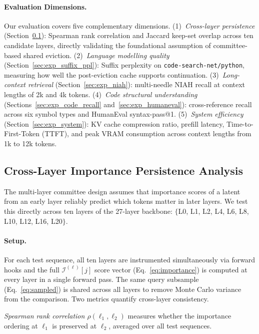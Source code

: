 \documentclass[letterpaper]{article} %
\begin{document}
\paragraph{Evaluation Dimensions.}
Our evaluation covers five complementary dimensions.
(1)~\emph{Cross-layer persistence} (Section~\ref{sec:exp_persistence}):
Spearman rank correlation and Jaccard keep-set overlap across ten
candidate layers, directly validating the foundational assumption of
committee-based shared eviction.
(2)~\emph{Language modelling quality} (Section~\ref{sec:exp_suffix_ppl}):
Suffix perplexity on \texttt{code-search-net/python}, measuring how well
the post-eviction cache supports continuation.
(3)~\emph{Long-context retrieval} (Section~\ref{sec:exp_niah}):
multi-needle NIAH recall at context lengths of 2k and 4k tokens.
(4)~\emph{Code structural understanding}
(Sections~\ref{sec:exp_code_recall} and~\ref{sec:exp_humaneval}):
cross-reference recall across six symbol types and HumanEval
syntax-pass@1.
(5)~\emph{System efficiency} (Section~\ref{sec:exp_system}):
KV cache compression ratio, prefill latency, Time-to-First-Token (TTFT),
and peak VRAM consumption across context lengths from 1k to 12k tokens.



\subsection{Cross-Layer Importance Persistence Analysis}
\label{sec:exp_persistence}

The multi-layer committee design assumes that importance scores of a latent from an
early layer reliably predict which tokens matter in later layers.
We test this directly across ten layers of the 27-layer backbone:
$\{$L0, L1, L2, L4, L6, L8, L10, L12, L16, L20$\}$.

\paragraph{Setup.}
For each test sequence, all ten layers are instrumented simultaneously
via forward hooks and the full $\mathcal{I}^{(\ell)}[j]$ score vector
(Eq.~\eqref{eq:importance}) is computed at every layer in a single
forward pass.
The same query subsample (Eq.~\eqref{eq:sampled}) is shared across all
layers to remove Monte Carlo variance from the comparison.
Two metrics quantify cross-layer consistency.

\emph{Spearman rank correlation $\rho(\ell_1,\ell_2)$} measures whether
the importance ordering at $\ell_1$ is preserved at $\ell_2$, averaged
over all test sequences.
\end{document}

